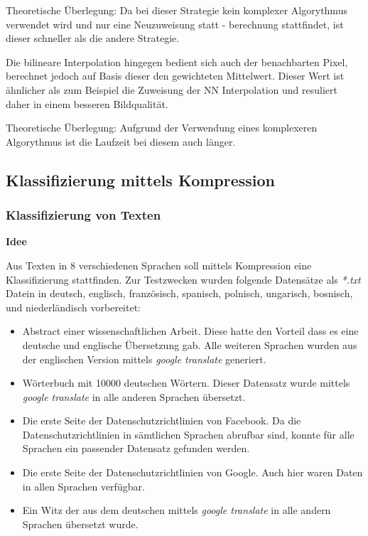 \documentclass[12pt,german]{article}
\begin{document}
Theoretische Überlegung: Da bei dieser Strategie kein komplexer Algorythmus verwendet wird und nur eine Neuzuweisung statt - berechnung stattfindet, ist dieser schneller als die andere Strategie.

Die bilineare Interpolation hingegen bedient sich auch der benachbarten Pixel, berechnet jedoch auf Basis dieser den gewichteten Mittelwert. Dieser Wert ist ähnlicher als zum Beispiel die Zuweisung der NN Interpolation und resuliert daher in einem besseren Bildqualität. 

Theoretische Überlegung: Aufgrund der Verwendung eines komplexeren Algorythmus ist die Laufzeit bei diesem auch länger.

 \subsection{Klassifizierung mittels Kompression}
\subsubsection{Klassifizierung von Texten}

\textbf{Idee}

Aus Texten in 8 verschiedenen Sprachen soll mittels Kompression eine Klassifizierung stattfinden. Zur Testzwecken wurden folgende Datensätze als \textit{ *.txt}  Datein in deutsch, englisch, französisch, spanisch, polnisch, ungarisch, bosnisch, und niederländisch vorbereitet:

\begin{itemize}
	\item Abstract einer wissenschaftlichen Arbeit. Diese hatte den Vorteil dass es eine deutsche und englische Übersetzung gab. Alle weiteren Sprachen wurden aus der englischen Version mittels \textit{google translate} generiert.
	\item Wörterbuch mit 10000 deutschen Wörtern. Dieser Datensatz wurde mittels \textit{google translate} in alle anderen Sprachen übersetzt.
	\item Die erste Seite der Datenschutzrichtlinien von Facebook. Da die Datenschutzrichtlinien in sämtlichen Sprachen abrufbar sind, konnte für alle Sprachen ein passender Datensatz gefunden werden.
	\item Die erste Seite der Datenschutzrichtlinien von Google. Auch hier waren Daten in allen Sprachen verfügbar.
	\item Ein Witz der aus dem deutschen mittels \textit{google translate} in alle andern Sprachen übersetzt wurde.
\end{itemize}
\end{document}

